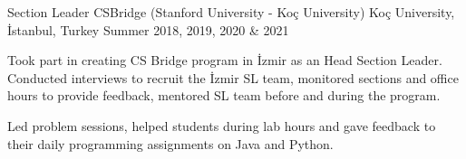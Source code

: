 
\vspace*{-1.5mm}

\begin{cventries}



  \cventry
    {Section Leader}%
    {CSBridge (Stanford University - Koç University)} %
    {Koç University, İstanbul, Turkey}
    {Summer 2018, 2019, 2020 \& 2021} 
    {
      \begin{cvitems}
        \item{Took part in creating CS Bridge program in İzmir as an Head Section Leader. Conducted interviews to recruit the İzmir SL team, monitored sections and office hours to provide feedback, mentored SL team before and during the program.}
        \item{Led problem sessions, helped students during lab hours and gave feedback to their daily programming assignments on Java and Python.}
      \end{cvitems}
    }



\end{cventries}
